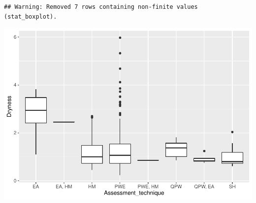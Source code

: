 \documentclass[]{elsarticle} %
\newenvironment{Shaded}{\begin{snugshade}}{\end{snugshade}}
\newcommand{\DecValTok}[1]{\textcolor[rgb]{0.00,0.00,0.81}{#1}}
\newcommand{\KeywordTok}[1]{\textcolor[rgb]{0.13,0.29,0.53}{\textbf{#1}}}
\newcommand{\NormalTok}[1]{#1}
\newcommand{\OperatorTok}[1]{\textcolor[rgb]{0.81,0.36,0.00}{\textbf{#1}}}
\newcommand{\StringTok}[1]{\textcolor[rgb]{0.31,0.60,0.02}{#1}}
\begin{document}
\begin{Shaded}
\end{Shaded}

\begin{verbatim}
## Warning: Removed 7 rows containing non-finite values (stat_boxplot).
\end{verbatim}

\includegraphics{Forest_and_Water_files/figure-latex/unnamed-chunk-15-1.pdf}

\begin{Shaded}
\end{Shaded}
\end{document}
